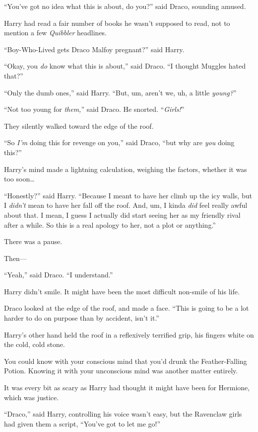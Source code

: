 “You’ve got no idea what this is about, do you?” said Draco, sounding amused.

Harry had read a fair number of books he wasn’t supposed to read, not to mention a few \emph{Quibbler} headlines.

“Boy-Who-Lived gets Draco Malfoy pregnant?” said Harry.

“Okay, you \emph{do} know what this is about,” said Draco. “I thought Muggles hated that?”

“Only the dumb ones,” said Harry. “But, um, aren’t we, uh, a little \emph{young?}”

“Not too young for \emph{them,}” said Draco. He snorted. “\emph{Girls!}”

They silently walked toward the edge of the roof.

“So \emph{I’m} doing this for revenge on you,” said Draco, “but why are \emph{you} doing this?”

Harry’s mind made a lightning calculation, weighing the factors, whether it was too soon…

“Honestly?” said Harry. “Because I meant to have her climb up the icy walls, but I \emph{didn’t} mean to have her fall off the roof. And, um, I kinda \emph{did} feel really awful about that. I mean, I guess I actually did start seeing her as my friendly rival after a while. So this is a real apology to her, not a plot or anything.”

There was a pause.

Then—

“Yeah,” said Draco. “I understand.”

Harry didn’t smile. It might have been the most difficult non-smile of his life.

Draco looked at the edge of the roof, and made a face. “This is going to be a lot harder to do on purpose than by accident, isn’t it.”

\later

Harry’s other hand held the roof in a reflexively terrified grip, his fingers white on the cold, cold stone.

You could know with your conscious mind that you’d drunk the Feather-Falling Potion. Knowing it with your unconscious mind was another matter entirely.

It was every bit as scary as Harry had thought it might have been for Hermione, which was justice.

“Draco,” said Harry, controlling his voice wasn’t easy, but the Ravenclaw girls had given them a script, “You’ve got to let me go!”

